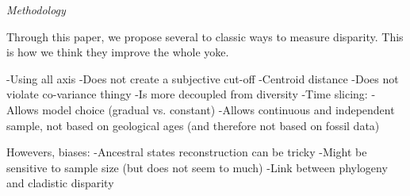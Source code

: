 \documentclass[12pt,letterpaper]{article}
\renewcommand{\subsection}[1]{%
\bigskip
\begin{center}
\begin{large}
\normalfont\itshape #1
\end{large}
\end{center}}
\begin{document}


\subsection{Methodology}
Through this paper, we propose several to classic ways to measure disparity.
This is how we think they improve the whole yoke.

-Using all axis
    -Does not create a subjective cut-off
-Centroid distance
    -Does not violate co-variance thingy
    -Is more decoupled from diversity 
-Time slicing:
    -Allows model choice (gradual vs. constant)
    -Allows continuous and independent sample, not based on geological ages (and therefore not based on fossil data)

Howevers, biases:
    -Ancestral states reconstruction can be tricky
    -Might be sensitive to sample size (but does not seem to much)
    -Link between phylogeny and cladistic disparity
\end{document}
